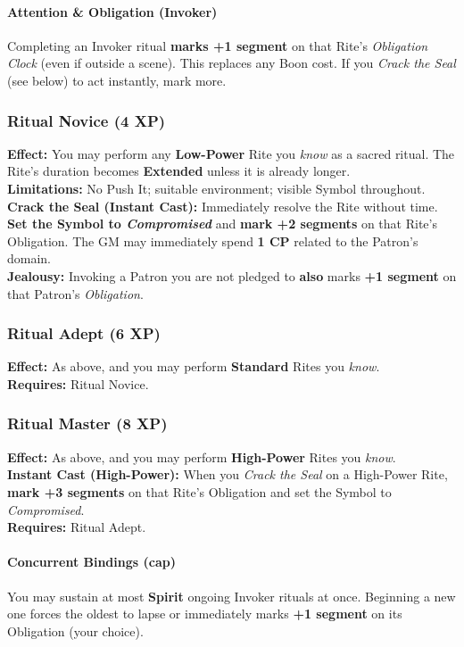 \documentclass[12pt,twoside]{book}
\begin{document}
\paragraph{Attention \& Obligation (Invoker)}
Completing an Invoker ritual \textbf{marks +1 segment} on that Rite’s \emph{Obligation Clock} (even if outside a scene). This replaces any Boon cost. If you \emph{Crack the Seal} (see below) to act instantly, mark more.

\subsubsection*{Ritual Novice (4 XP)}
\textbf{Effect:} You may perform any \textbf{Low-Power} Rite you \emph{know} as a sacred ritual. The Rite’s duration becomes \textbf{Extended} unless it is already longer.\\
\textbf{Limitations:} No Push It; suitable environment; visible Symbol throughout.\\
\textbf{Crack the Seal (Instant Cast):} Immediately resolve the Rite without time. \textbf{Set the Symbol to \emph{Compromised}} and \textbf{mark +2 segments} on that Rite’s Obligation. The GM may immediately spend \textbf{1 CP} related to the Patron’s domain.\\
\textbf{Jealousy:} Invoking a Patron you are not pledged to \textbf{also} marks \textbf{+1 segment} on that Patron’s \emph{Obligation}.

\subsubsection*{Ritual Adept (6 XP)} 
\textbf{Effect:} As above, and you may perform \textbf{Standard} Rites you \emph{know}.\\
\textbf{Requires:} Ritual Novice.

\subsubsection*{Ritual Master (8 XP)} 
\textbf{Effect:} As above, and you may perform \textbf{High-Power} Rites you \emph{know}.\\
\textbf{Instant Cast (High-Power):} When you \emph{Crack the Seal} on a High-Power Rite, \textbf{mark +3 segments} on that Rite’s Obligation and set the Symbol to \emph{Compromised}.\\
\textbf{Requires:} Ritual Adept.

\paragraph{Concurrent Bindings (cap)}
You may sustain at most \textbf{Spirit} ongoing Invoker rituals at once. Beginning a new one forces the oldest to lapse or immediately marks \textbf{+1 segment} on its Obligation (your choice).
\end{document}
